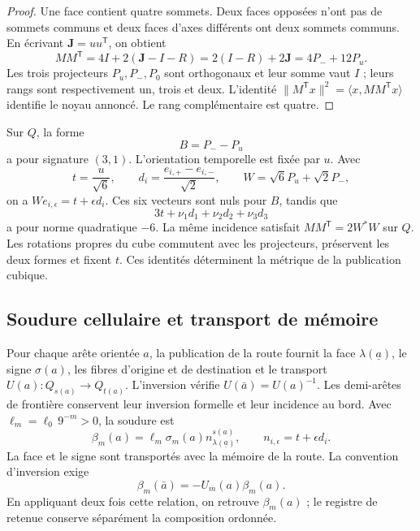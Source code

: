 \begin{proof}
Une face contient quatre sommets. Deux faces opposées n'ont pas de sommets
communs et deux faces d'axes différents ont deux sommets communs.
En écrivant \(\mathbf J=uu^{\mathsf T}\), on obtient
\[
 MM^{\mathsf T}=4I+2(\mathbf J-I-R)
 =2(I-R)+2\mathbf J=4P_-+12P_u.
\]
Les trois projecteurs \(P_u,P_-,P_0\) sont orthogonaux et leur somme vaut \(I\) ; leurs rangs sont respectivement un, trois et deux. L'identité \(\|M^{\mathsf T}x\|^2=\langle x,MM^{\mathsf T}x\rangle\) identifie le noyau annoncé. Le rang complémentaire est quatre.
\end{proof}

Sur \(Q\), la forme
\[
 B=P_--P_u
\]
a pour signature \((3,1)\). L'orientation temporelle est fixée par \(u\).
Avec
\[
 t=\frac{u}{\sqrt6},\qquad
 d_i=\frac{e_{i,+}-e_{i,-}}{\sqrt2},\qquad
 W=\sqrt6P_u+\sqrt2P_-,
\]
on a \(We_{i,\epsilon}=t+\epsilon d_i\). Ces six vecteurs
sont nuls pour \(B\), tandis que
\[
 3t+\nu_1d_1+\nu_2d_2+\nu_3d_3
\]
a pour norme quadratique \(-6\). La même incidence satisfait
\(MM^{\mathsf T}=2W^*W\) sur \(Q\). Les rotations propres du cube
commutent avec les projecteurs, préservent les deux formes et fixent \(t\).
Ces identités déterminent la métrique de la publication cubique.

\subsection{Soudure cellulaire et transport de mémoire}
\label{vii:vii:sec:soldadura-celular}

Pour chaque arête orientée \(a\), la publication de la route fournit
la face \(\lambda(\underline a)\), le signe
\(\sigma(a)\), les fibres d'origine et de destination et le transport
\(U(a):Q_{s(a)}\longrightarrow Q_{t(a)}\).
L'inversion vérifie \(U(\bar a)=U(a)^{-1}\).
Les demi-arêtes de frontière conservent leur inversion formelle et leur incidence
au bord. Avec \(\ell_m=\ell_0\,9^{-m}>0\), la soudure est
\begin{equation}
 \beta_m(a)=\ell_m\sigma_m(a)
              n_{\lambda(\underline a)}^{s(a)},\qquad
 n_{i,\epsilon}=t+\epsilon d_i.
 \label{vii:vii:eq:soldadura-arista}
\end{equation}
La face et le signe sont transportés avec la mémoire de la route. La convention d'inversion exige
\begin{equation}
 \beta_m(\bar a)=-U_m(a)\beta_m(a).
 \label{vii:vii:eq:inversion-soldadura}
\end{equation}
En appliquant deux fois cette relation, on retrouve \(\beta_m(a)\) ; le registre de retenue conserve séparément la composition ordonnée.

